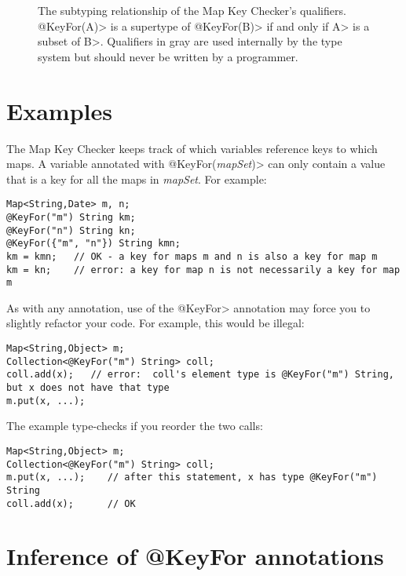 \begin{figure}
\caption{The subtyping relationship of the Map Key Checker's qualifiers.
\<@KeyFor(A)> is a supertype of \<@KeyFor(B)> if and only if \<A> is a subset of
\<B>.  Qualifiers in gray are used internally by the type system but should
never be written by a programmer.}
\label{fig-map-key-keyfor-hierarchy}
\end{figure}

\section{Examples\label{map-key-examples}}

The Map Key Checker keeps track of which variables reference keys to
which maps.  A variable annotated with \<@KeyFor(\emph{mapSet})> can only
contain a value that is a key for all the maps in \emph{mapSet}.  For example:

\begin{verbatim}
Map<String,Date> m, n;
@KeyFor("m") String km;
@KeyFor("n") String kn;
@KeyFor({"m", "n"}) String kmn;
km = kmn;   // OK - a key for maps m and n is also a key for map m
km = kn;    // error: a key for map n is not necessarily a key for map m
\end{verbatim}


As with any annotation, use of the \<@KeyFor> annotation may force you to
slightly refactor your code.  For example, this would be illegal:

\begin{verbatim}
Map<String,Object> m;
Collection<@KeyFor("m") String> coll;
coll.add(x);   // error:  coll's element type is @KeyFor("m") String, but x does not have that type
m.put(x, ...);
\end{verbatim}

\noindent
The example type-checks if you reorder the two calls:

\begin{verbatim}
Map<String,Object> m;
Collection<@KeyFor("m") String> coll;
m.put(x, ...);    // after this statement, x has type @KeyFor("m") String
coll.add(x);      // OK
\end{verbatim}



\section{Inference of @KeyFor annotations\label{map-key-annotations-inference}}

